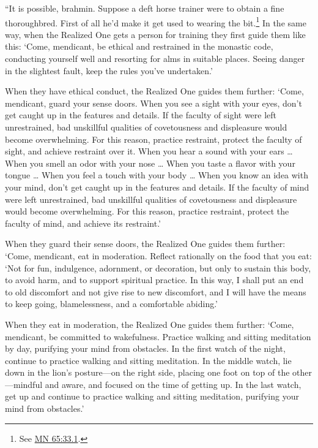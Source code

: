 \documentclass[12pt,openany]{book}%
\begin{document}
“It is possible, brahmin. Suppose a deft horse trainer were to obtain a fine thoroughbred. First of all he’d make it get used to wearing the bit.\footnote{See \href{https://suttacentral.net/mn65/en/sujato\#33.1}{MN 65:33.1}. } In the same way, when the Realized One gets a person for training they first guide them like this: ‘Come, mendicant, be ethical and restrained in the monastic code, conducting yourself well and resorting for alms in suitable places. Seeing danger in the slightest fault, keep the rules you’ve undertaken.’ 

When they have ethical conduct, the Realized One guides them further: ‘Come, mendicant, guard your sense doors. When you see a sight with your eyes, don’t get caught up in the features and details. If the faculty of sight were left unrestrained, bad unskillful qualities of covetousness and displeasure would become overwhelming. For this reason, practice restraint, protect the faculty of sight, and achieve restraint over it. When you hear a sound with your ears … When you smell an odor with your nose … When you taste a flavor with your tongue … When you feel a touch with your body … When you know an idea with your mind, don’t get caught up in the features and details. If the faculty of mind were left unrestrained, bad unskillful qualities of covetousness and displeasure would become overwhelming. For this reason, practice restraint, protect the faculty of mind, and achieve its restraint.’ 

When they guard their sense doors, the Realized One guides them further: ‘Come, mendicant, eat in moderation. Reflect rationally on the food that you eat: ‘Not for fun, indulgence, adornment, or decoration, but only to sustain this body, to avoid harm, and to support spiritual practice. In this way, I shall put an end to old discomfort and not give rise to new discomfort, and I will have the means to keep going, blamelessness, and a comfortable abiding.’ 

When they eat in moderation, the Realized One guides them further: ‘Come, mendicant, be committed to wakefulness. Practice walking and sitting meditation by day, purifying your mind from obstacles. In the first watch of the night, continue to practice walking and sitting meditation. In the middle watch, lie down in the lion’s posture—on the right side, placing one foot on top of the other—mindful and aware, and focused on the time of getting up. In the last watch, get up and continue to practice walking and sitting meditation, purifying your mind from obstacles.’ 
\end{document}
